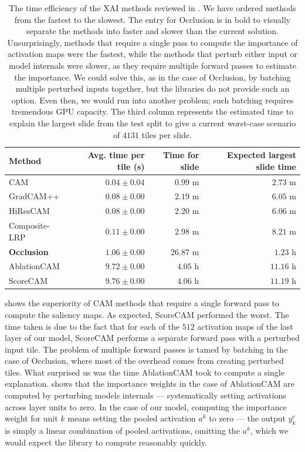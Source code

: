 \begin{table}
\centering
{}
\begin{tabular}{@{} l @{\ }r r r @{}}\toprule
Method & Avg. time per tile (s) & Time for slide & Expected largest slide time \\ 
\midrule
CAM                 & $0.04 \pm 0.04$ & $0.99$ m   & $2.73$ m \\
GradCAM++           & $0.08 \pm 0.00$ & $2.19$ m   & $6.05$ m \\
HiResCAM            & $0.08 \pm 0.00$ & $2.20$ m   & $6.06$ m \\
Composite-LRP       & $0.11 \pm 0.00$ & $2.98$ m   & $8.21$ m \\
\textbf{Occlusion}  & $1.06 \pm 0.00$ & $26.87$ m  & $1.23$ h \\
AblationCAM         & $9.72 \pm 0.00$ & $4.05$ h   & $11.16$ h \\
ScoreCAM            & $9.76 \pm 0.00$ & $4.06$ h   & $11.19$ h \\
\bottomrule
\end{tabular}
\caption{
The time efficiency of the XAI methods reviewed in .
We have ordered methods from the fastest to the slowest.
The entry for Occlusion is in bold to visually separate the methods into faster and slower than the current solution.
Unsurprisingly, methods that require a single pass to compute the importance of activation maps were the fastest, while the methods that perturb either input or model internals were slower, as they require multiple forward passes to estimate the importance.
We could solve this, as in the case of Occlusion, by batching multiple perturbed inputs together, but the libraries do not provide such an option.
Even then, we would run into another problem; such batching requires tremendous GPU capacity.
The third column represents the estimated time to explain the largest slide from the test split to give a current worst-case scenario of $4131$ tiles per slide.
}
\label{tab:comp-time}
\end{table}

 shows the superiority of CAM methods that require a single forward pass to compute the saliency maps.
As expected, ScoreCAM performed the worst.
The time taken is due to the fact that for each of the $512$ activation maps of the last layer of our model, ScoreCAM performs a separate forward pass with a perturbed input tile.
The problem of multiple forward passes is tamed by batching in the case of Occlusion, where most of the overhead comes from creating perturbed tiles.
What surprised us was the time AblationCAM took to compute a single explanation.
 shows that the importance weights in the case of AblationCAM are computed by perturbing models internals --- systematically setting activations across layer units to zero.
In the case of our model, computing the importance weight for unit $k$ means setting the pooled activation $a^k$ to zero --- the output $y^c_k$ is simply a linear combination of pooled activations, omitting the $a^k$, which we would expect the library to compute reasonably quickly.

